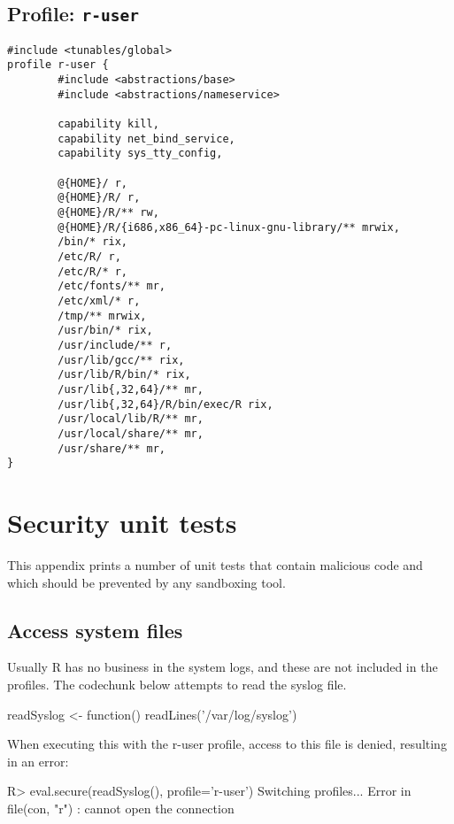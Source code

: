 \documentclass{jss}
\newcommand{\R}{\textsf{R}\xspace}
\begin{document}
\begin{appendices}
\subsection[Profile: r-user]{Profile: \texttt{r-user}}
\label{r-user}

\begin{verbatim}
#include <tunables/global>
profile r-user {
        #include <abstractions/base>
        #include <abstractions/nameservice>
	
        capability kill,
        capability net_bind_service,
        capability sys_tty_config,
	
        @{HOME}/ r,
        @{HOME}/R/ r,
        @{HOME}/R/** rw,
        @{HOME}/R/{i686,x86_64}-pc-linux-gnu-library/** mrwix,
        /bin/* rix,
        /etc/R/ r,
        /etc/R/* r,
        /etc/fonts/** mr,
        /etc/xml/* r,
        /tmp/** mrwix,
        /usr/bin/* rix,
        /usr/include/** r,
        /usr/lib/gcc/** rix,		
        /usr/lib/R/bin/* rix,
        /usr/lib{,32,64}/** mr,
        /usr/lib{,32,64}/R/bin/exec/R rix,
        /usr/local/lib/R/** mr,
        /usr/local/share/** mr,
        /usr/share/** mr,
}
\end{verbatim}



\section{Security unit tests}

This appendix prints a number of unit tests that contain malicious code and
which should be prevented by any sandboxing tool.

\subsection{Access system files}

Usually \R has no business in the system logs, and these are not included in the
profiles. The codechunk below attempts to read the syslog file.
\begin{CodeChunk}
\begin{CodeInput}
readSyslog <- function(){
	readLines('/var/log/syslog')
}
\end{CodeInput}
\end{CodeChunk}
When executing this with the r-user profile, access to this file is denied,
resulting in an error:
\begin{CodeChunk}
\begin{CodeInput}
R> eval.secure(readSyslog(), profile='r-user')
Switching profiles...
Error in file(con, "r") : cannot open the connection
\end{CodeInput}
\end{CodeChunk}


\end{appendices}
\end{document}
